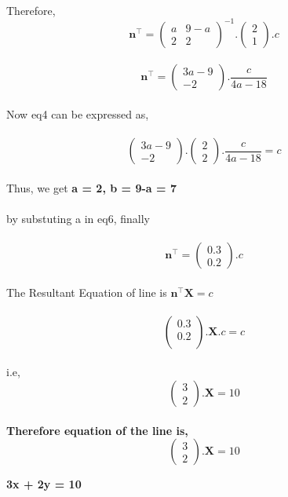 \documentclass[journal,12pt,twocolumn]{IEEEtran}
\newcommand{\myvec}[1]{\ensuremath{\begin{pmatrix}#1\end{pmatrix}}}
\let\vec\mathbf
\begin{document}
 \\
 Therefore,\\
 \begin{equation}
	 \vec{n^{\top}} = 
	 \myvec{
  a & 9-a\\
  2 & 2
 }
  ^{-1}
  .
	 \myvec{
  2\\
  1}
 .c \label{eq-6}
\end{equation}
 \\
\begin{equation}
	\vec{n^{\top}} = 
	\myvec{
  3a-9\\
  -2}
  .\frac{c}{4a-18}
 \label{eq-7}
\end{equation}
 \\
 Now eq4 can be expressed as,\\
 \\
  \begin{equation}
	  \myvec{
  3a - 9\\
  -2}
 .
	  \myvec{
  2\\
  2}
  .\frac{c}{4a-18} = c
 \label{eq-8}
\end{equation}
  \\
  Thus, we get \textbf{a = 2, b = 9-a = 7}\\
  \\
  by substuting a in eq6, finally\\
  \\
   \begin{equation}
	   \vec{n^{\top}} = 
	   \myvec{
  0.3\\
  0.2}
 .c
 \end{equation}
  \\
The Resultant Equation of line is ${\vec{n^{\top}}\vec{X}} = c$ \\
\\
 \begin{equation}
	 \myvec{
  0.3\\
  0.2\\
 }
	 .\vec{X}.c = c
 \end{equation}
  \\
i.e,    \\
\begin{equation}
	\myvec{
  3\\
  2}
	.\vec{X} = 10
 \end{equation}
\\
\textbf{
Therefore equation of the line is, \\
\begin{equation}
	\myvec{
  3\\
  2}
	. \vec{X} = 10
 \end{equation}}
\begin{center}
    \textbf{3x + 2y = 10}
\end{center}
\end{document}
